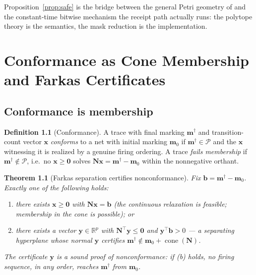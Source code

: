 \documentclass[11pt,oneside]{book}
\theoremstyle{definition}
\newtheorem{definition}{Definition}[chapter]
\theoremstyle{plain}
\newtheorem{theorem}{Theorem}[chapter]
\theoremstyle{remark}
\DeclareMathOperator{\cone}{cone}
\newcommand{\Poly}{\mathcal{P}}                %
\newcommand{\Nmat}{\mathbf{N}}                 %
\begin{document}
Proposition~\ref{prop:safe} is the bridge between the general Petri geometry of
\cite{murata1989} and the constant-time bitwise mechanism the receipt path actually runs: the
polytope theory is the semantics, the mask reduction is the implementation.

\chapter{Conformance as Cone Membership and Farkas Certificates}
\label{ch:conformance}

\section{Conformance is membership}

\begin{definition}[Conformance]\label{def:conf}
A trace with final marking $\bm m^{\dagger}$ and transition-count vector $\bm x$
\emph{conforms} to a net with initial marking $\bm m_{0}$ if $\bm m^{\dagger}\in\Poly$ and the
$\bm x$ witnessing it is realized by a genuine firing ordering. A trace \emph{fails membership}
if $\bm m^{\dagger}\notin\Poly$, i.e.\ no $\bm x\ge\bm 0$ solves
$\Nmat\bm x=\bm m^{\dagger}-\bm m_{0}$ within the nonnegative orthant.
\end{definition}

\begin{theorem}[Farkas separation certifies nonconformance]\label{thm:farkas}
Fix $\bm b=\bm m^{\dagger}-\bm m_{0}$. Exactly one of the following holds:
\begin{enumerate}[label=(\alph*),leftmargin=*]
\item there exists $\bm x\ge\bm 0$ with $\Nmat\bm x=\bm b$ (the continuous relaxation is
      feasible; membership in the cone is possible); or
\item there exists a vector $\bm y\in\mathbb{R}^{p}$ with $\Nmat^{\!\top}\bm y\le\bm 0$ and
      $\bm y^{\!\top}\bm b>0$ --- a separating hyperplane whose normal $\bm y$ certifies
      $\bm m^{\dagger}\notin\bm m_{0}+\cone(\Nmat)$.
\end{enumerate}
The certificate $\bm y$ is a \emph{sound proof of nonconformance}: if (b) holds, no firing
sequence, in any order, reaches $\bm m^{\dagger}$ from $\bm m_{0}$.
\end{theorem}
\end{document}
